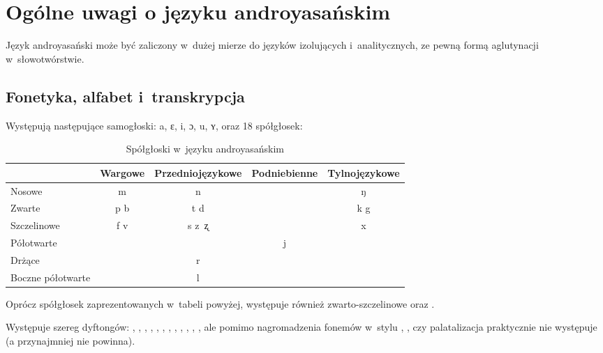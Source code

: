 \section[Ogólne uwagi]{Ogólne uwagi o języku androyasańskim}

\begin{spacing}{1.1}
    Język androyasański może być zaliczony w~dużej mierze do języków
    izolujących i~analitycznych, ze pewną formą aglutynacji w~słowotwórstwie.

    \subsection{Fonetyka, alfabet i~transkrypcja}

    Występują następujące samogłoski: a, ɛ, i, ɔ, u, ʏ, oraz 18 spółgłosek:

    \begin{table}[ht]
        \centering
        \caption{Spółgłoski w~języku androyasańskim}
        \begin{tabular}{lcccc}\toprule
                              & Wargowe & Przedniojęzykowe & Podniebienne & Tylnojęzykowe \\\midrule
            Nosowe            & m       & n                &              & ŋ             \\\midrule
            Zwarte            & p b     & t d              &              & k g           \\\midrule
            Szczelinowe       & f v     & s z~ʐ            &              & x             \\\midrule
            Półotwarte        &         &                  & j            &               \\\midrule
            Drżące            &         & r                &              &               \\\midrule
            Boczne półotwarte &         & l                &              &               \\\bottomrule
        \end{tabular}
        \label{tab:consonants}
    \end{table}

    Oprócz spółgłosek zaprezentowanych w~tabeli powyżej, występuje
    również zwarto-szczelinowe  oraz .

    Występuje szereg dyftongów: , , , , ,
    , , , , , , , ale pomimo
    nagromadzenia fonemów w~stylu , , czy  palatalizacja
    praktycznie nie występuje (a przynajmniej nie powinna).


\end{spacing}
